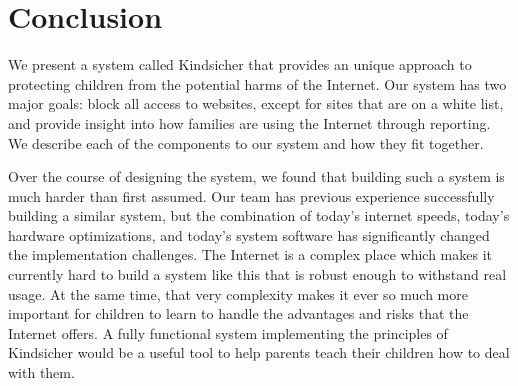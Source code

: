 
\section{Conclusion}

We present a system called Kindsicher that provides an unique approach to
protecting children from the potential harms of the Internet. Our system has
two major goals: block all access to websites, except for sites that are on a
white list, and provide insight into how families are using the Internet through
reporting. We describe each of the components to our system and how they fit
together.

Over the course of designing the system, we found that building such a system
is much harder than first assumed.  
%
Our team has previous experience successfully building a similar system, but
the combination of today's internet speeds, today's hardware optimizations,
and today's system software has significantly changed the implementation
challenges.
%
The Internet is a complex place which makes it currently hard to build a
system like this that is robust enough to withstand real usage.
%
At the same time, that very complexity makes it ever so much more
important for children to learn to handle the advantages and risks that
the Internet offers.  A fully functional system implementing the principles of
Kindsicher would be a useful tool to help parents teach their children how to
deal with them.

